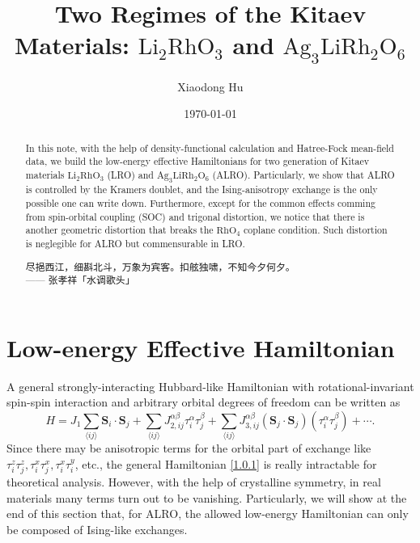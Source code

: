 \documentclass[10pt,nofootinbib,letterpaper]{revtex4}
\newcommand*{\kaishu}{\CJKfamily{kaishu}}
\begin{document}
\title{Two Regimes of the Kitaev Materials: $\mathrm{Li}_2\mathrm{RhO}_3$ and $\mathrm{Ag}_3\mathrm{Li}\mathrm{Rh}_2\mathrm{O}_6$}
\author{Xiaodong Hu}


\date{\today}

\begin{abstract}
	In this note, with the help of density-functional calculation and Hatree-Fock mean-field data, we build the low-energy effective Hamiltonians for two generation of Kitaev materials $\mathrm{Li}_2\mathrm{RhO}_3$ (LRO) and $\mathrm{Ag}_3\mathrm{Li}\mathrm{Rh}_2\mathrm{O}_6$ (ALRO). Particularly, we show that ALRO is controlled by the Kramers doublet, and the Ising-anisotropy exchange is the only possible one can write down. Furthermore, except for the common effects comming from spin-orbital coupling (SOC) and trigonal distortion, we notice that there is another geometric distortion that breaks the $\mathrm{RhO}_4$ coplane condition. Such distortion is neglegible for ALRO but commensurable in LRO.\par
		\hfill\par
		{\centering\kaishu 尽挹西江，细斟北斗，万象为宾客。扣舷独啸，不知今夕何夕。\\[0.5em]}
	\hfill------ 张孝祥「水调歌头」
\end{abstract}

\maketitle
\tableofcontents

\section{Low-energy Effective Hamiltonian}
	A general strongly-interacting Hubbard-like Hamiltonian with rotational-invariant spin-spin interaction and arbitrary orbital degrees of freedom can be written as
	\begin{equation}\label{1.0.1}
		H=J_1\sum_{\langle ij \rangle}\bm{S}_i\cdot\bm{S}_j+\sum_{\langle ij \rangle}J_{2,ij}^{\alpha\beta}\tau_i^\alpha \tau_j^\beta+\sum_{\langle ij \rangle}J_{3,ij}^{\alpha\beta}(\bm{S}_j\cdot\bm{S}_j)(\tau_i^\alpha \tau_j^\beta)+\cdots.
	\end{equation}
	\indent Since there may be anisotropic terms for the orbital part of exchange like $\tau_i^z\tau_j^z,\tau_i^x\tau_j^x,\tau_i^x\tau_i^y$, etc., the general Hamiltonian \eqref{1.0.1} is really intractable for theoretical analysis. However, with the help of crystalline symmetry, in real materials many terms turn out to be vanishing. Particularly, we will show at the end of this section that, for ALRO, the allowed low-energy Hamiltonian can only be composed of Ising-like exchanges.
\end{document}
